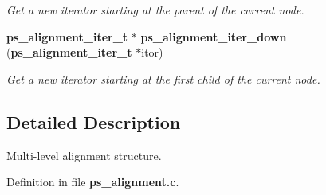 \begin{DoxyCompactItemize}
\begin{DoxyCompactList}\small\item\em \-Get a new iterator starting at the parent of the current node. \end{DoxyCompactList}\item 
{\bf ps\-\_\-alignment\-\_\-iter\-\_\-t} $\ast$ {\bf ps\-\_\-alignment\-\_\-iter\-\_\-down} ({\bf ps\-\_\-alignment\-\_\-iter\-\_\-t} $\ast$itor)\label{ps__alignment_8c_a6356f643a01e2071c6f00f8a5d56565a}

\begin{DoxyCompactList}\small\item\em \-Get a new iterator starting at the first child of the current node. \end{DoxyCompactList}\end{DoxyCompactItemize}


\subsection{\-Detailed \-Description}
\-Multi-\/level alignment structure. 

\-Definition in file {\bf ps\-\_\-alignment.\-c}.

